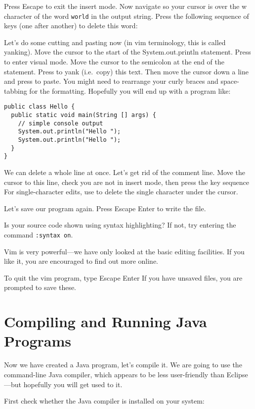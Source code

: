 \documentclass{article}
\begin{document}
Press Escape to exit the insert mode. Now navigate so your cursor is over the w character of the word \texttt{world} in the output string. Press the following sequence of keys (one after another) to delete this word:  

Let's do some cutting and pasting now (in vim terminology, this is called yanking).
Move the cursor to the start of the System.out.println statement. Press  to enter visual mode. Move the cursor to the semicolon at the end of the statement. Press  to yank (i.e.\ copy) this text.
Then move the cursor down a line and press  to paste. You might need to rearrange your curly braces and space-tabbing for the formatting. Hopefully you will end up with a program like:
\begin{lstlisting}[style=JavaProg]
public class Hello {
  public static void main(String [] args) {
    // simple console output
    System.out.println("Hello ");
    System.out.println("Hello ");
  }
}
\end{lstlisting}

We can delete a whole line at once. Let's get rid of the comment line. Move the cursor to this line, check you are not in insert mode, then press the key sequence  
For single-character edits, use  to delete the single character under the cursor.

Let's save our program again. Press Escape \keys{:}  Enter to write the file.

Is your source code shown using syntax highlighting? If not, try entering the command \texttt{:syntax on}.

Vim is very powerful---we have only looked at the basic editing facilities. If you like it, you are encouraged to find out more online.

To quit the vim program, type Escape \keys{:}  Enter
If you have unsaved files, you are prompted to save these. 

\section*{Compiling and Running Java Programs}

Now we have created a Java program, let's compile it. We are going to use the command-line Java compiler, which appears to be less user-friendly than Eclipse---but hopefully you will get used to it.

First check whether the Java compiler is installed on your system:
\end{document}
